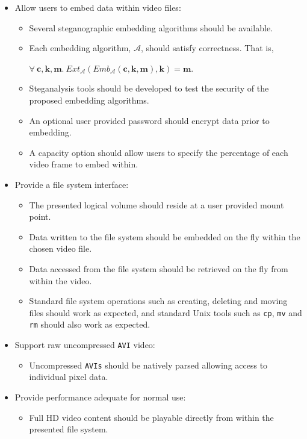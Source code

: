 \documentclass[paper=a4, fontsize=11pt,twoside]{scrartcl}    %
\numberwithin{table}{section}
\numberwithin{figure}{section}
\numberwithin{algorithm}{section}
\begin{document}
\begin{itemize}
\item Allow users to embed data within video files:
	\begin{itemize}
		\item Several steganographic embedding algorithms should be available.
		\item Each embedding algorithm, $\mathcal{A}$, should satisfy correctness. That is,
		\begin{center}
			$\forall ~\textbf{c}, \textbf{k}, \textbf{m}. ~Ext_{\mathcal{A}}(Emb_{\mathcal{A}}(\textbf{c}, \textbf{k}, \textbf{m}), \textbf{k}) = \textbf{m}$.
		\end{center}
		\item Steganalysis tools should be developed to test the security of the proposed embedding algorithms.
		\item An optional user provided password should encrypt data prior to embedding.
		\item A capacity option should allow users to specify the percentage of each video frame to embed within.
	\end{itemize}
\item Provide a file system interface:
	\begin{itemize}
		\item The presented logical volume should reside at a user provided mount point.		
		\item Data written to the file system should be embedded on the fly within the chosen video file.
		\item Data accessed from the file system should be retrieved on the fly from within the video.
		\item Standard file system operations such as creating, deleting and moving files should work as expected, and standard Unix tools such as \texttt{cp}, \texttt{mv} and \texttt{rm} should also work as expected.
	\end{itemize}	
\item Support raw uncompressed \texttt{AVI} video:
	\begin{itemize}
		\item Uncompressed \texttt{AVIs} should be natively parsed allowing access to individual pixel data.
	\end{itemize}	
\item Provide performance adequate for normal use:
	\begin{itemize}
		\item Full HD video content should be playable directly from within the presented file system.
	\end{itemize}		
\end{itemize}
\end{document}
